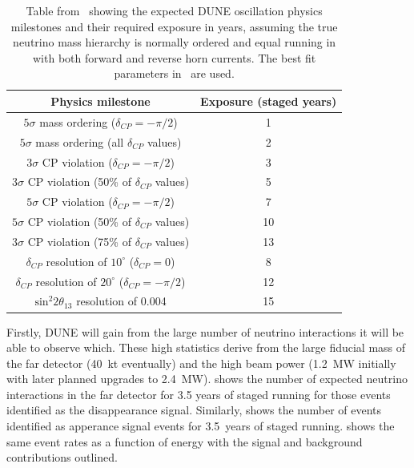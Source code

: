 \begin{table}
  \caption[DUNE oscillation physics milestones.]{Table from~\cite{tdrVol2} showing the expected DUNE oscillation physics milestones and their required exposure in years, assuming the true neutrino mass hierarchy is normally ordered and equal running in with both forward and reverse horn currents. The best fit parameters in~\cite{nufit4} are used.}
  \label{tab:physicsMilestones}
  \centering
  \begin{tabular}{c c}
    \hline
    Physics milestone & Exposure (staged years) \\
    \hline
    $5\sigma$ mass ordering ($\delta_{CP} = -\pi/2$) & 1 \\
    $5\sigma$ mass ordering (all $\delta_{CP}$ values) & 2 \\
    $3\sigma$ CP violation ($\delta_{CP}=-\pi/2$) & 3 \\
    $3\sigma$ CP violation (50\% of $\delta_{CP}$ values) & 5 \\
    $5\sigma$ CP violation ($\delta_{CP}=-\pi/2$) & 7 \\
    $5\sigma$ CP violation (50\% of $\delta_{CP}$ values) & 10 \\
    $3\sigma$ CP violation (75\% of $\delta_{CP}$ values) & 13 \\
    $\delta_{CP}$ resolution of $10^{\circ}$ ($\delta_{CP}=0$) & 8 \\
    $\delta_{CP}$ resolution of $20^{\circ}$ ($\delta_{CP}=-\pi/2$) & 12 \\
    $\text{sin}^{2}2\theta_{13}$ resolution of 0.004 & 15 \\
    \hline
  \end{tabular}
\end{table}

Firstly, DUNE will gain from the large number of neutrino interactions it will be able to observe which.
These high statistics derive from the large fiducial mass of the far detector (40~kt eventually) and the high beam power (1.2~MW initially with later planned upgrades to 2.4~MW).
 shows the number of expected neutrino interactions in the far detector for 3.5 years of staged running for those events identified as the disappearance signal.
Similarly,  shows the number of events identified as apperance signal events for 3.5~years of staged running.
 shows the same event rates as a function of energy with the signal and background contributions outlined.

